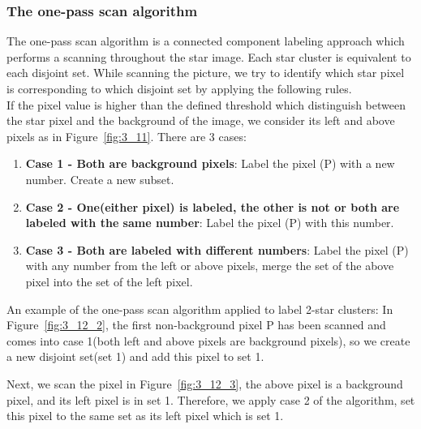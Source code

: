 \subsubsection{The one-pass scan algorithm}

The one-pass scan algorithm is a connected component labeling approach which performs a scanning throughout the star image. Each star cluster is equivalent to each disjoint set. While scanning the picture, we try to identify which star pixel is corresponding to which disjoint set by applying the following rules. \\

\noindent If the pixel value is higher than the defined threshold which distinguish between the star pixel and the background of the image, we consider its left and above pixels as in Figure~\ref{fig:3_11}. There are 3 cases:

\begin{enumerate}
	\item \textbf{Case 1 - Both are background pixels}: Label the pixel (P) with a new number. Create a new subset.
	\item \textbf{Case 2 - One(either pixel) is labeled, the other is not or both are labeled with the same number}: Label the pixel (P) with this number.
	\item \textbf{Case 3 - Both are labeled with different numbers}: Label the pixel (P) with any number from the left or above pixels, merge the set of the above pixel into the set of the left pixel.
\end{enumerate}


\noindent An example of the one-pass scan algorithm applied to label 2-star clusters: In Figure~\ref{fig:3_12_2}, the first non-background pixel P has been scanned and comes into case 1(both left and above pixels are background pixels), so we create a new disjoint set(set 1) and add this pixel to set 1.


\noindent Next, we scan the pixel in Figure~\ref{fig:3_12_3}, the above pixel is a background pixel, and its left pixel is in set 1. Therefore, we apply case 2 of the algorithm, set this pixel to the same set as its left pixel which is set 1.

